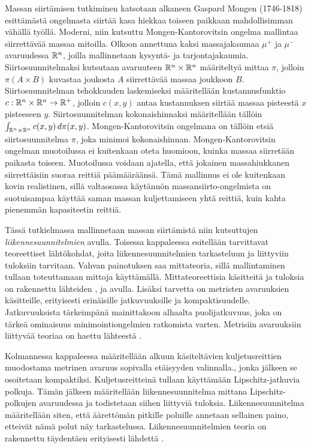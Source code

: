 \documentclass[12pt,oneside,a4paper]{amsbook} %
\begin{document}
Massan siirtämisen tutkiminen katsotaan alkaneen Gaspard Mongen (1746-1818) esittämästä ongelmasta \cite{monge} siirtää kasa hiekkaa toiseen paikkaan mahdollisimman vähällä työllä. Moderni, niin kutsuttu Mongen-Kantorovitsin ongelma mallintaa siirrettävää massaa mitoilla. Olkoon annettuna kaksi massajakaumaa $\mu^+$ ja $\mu^-$ avaruudessa $\mathbb{R}^n$, joilla mallinnetaan kysyntä- ja tarjontajakaumia. Siirtosuunnitelmaksi kutsutaan avaruuteen $\mathbb{R}^n \times \mathbb{R}^n$ määriteltyä mittaa $\pi$, jolloin $\pi(A\times B)$ kuvastaa joukosta $A$ siirrettävää massaa joukkoon $B$. Siirtosuunnitelman tehokkuuden laskemiseksi määritellään kustannusfunktio $c:\mathbb{R}^n\times \mathbb{R}^n \to {\mathbb{R}^{+}}$, jolloin $c(x, y)$ antaa kustannuksen siirtää massaa pisteestä $x$ pisteeseen $y$. Siirtosuunnitelman kokonaishinnaksi määritellään tällöin $\int_{\mathbb{R}^n\times \mathbb{R}^n} c(x, y) \, d\pi(x, y)$. Mongen-Kantorovitsin ongelmana on tällöin etsiä siirtosuunnitelma $\pi$, joka minimoi kokonaishinnan. \cite[s. 11]{optimal} Mongen-Kantorovitsin ongelman muotoilussa ei kuitenkaan oteta huomioon, kuinka massaa siirretään paikasta toiseen. Muotoilussa voidaan ajatella, että jokainen massahiukkanen siirrettäisiin suoraa reittiä päämääräänsä. Tämä mallinnus ei ole kuitenkaan kovin realistinen, sillä valtaosassa käytännön massansiirto-ongelmista on suotuisampaa käyttää saman massan kuljettamiseen yhtä reittiä, kuin kahta pienemmän kapasiteetin reittiä. 

Tässä tutkielmassa mallinnetaan massan siirtämistä niin kutsuttujen \textit{liikennesuunnitelmien} avulla. Toisessa kappaleessa esitellään tarvittavat teoreettiset lähtökohdat, joita liikennesuunnitelmien tarkasteluun ja liittyviin tuloksiin tarvitaan. Vahvan painotuksen saa mittateoria, sillä mallintaminen tullaan toteuttamaan mittoja käyttämällä. Mittateoreettisia käsitteitä ja tuloksia on rakennettu lähteiden \cite{lehrbäck}, \cite{rudin} ja \cite{conway} avulla. Lisäksi tarvetta on metristen avaruuksien käsitteille, erityisesti erinäisille jatkuvuuksille ja kompaktisuudelle. Jatkuvuuksista tärkeimpänä mainittakoon alhaalta puolijatkuvuus, joka on tärkeä ominaisuus minimointiongelmien ratkomista varten. Metrisiin avaruuksiin liittyvää teoriaa on haettu lähteestä \cite{rudin}.

Kolmannessa kappaleessa määritellään alkuun käsiteltävien kuljetusreittien muodostama metrinen avaruus sopivalla etäisyyden valinnalla., jonka jälkeen se osoitetaan kompaktiksi. Kuljetusreitteinä tullaan käyttämään Lipschitz-jatkuvia polkuja. Tämän jälkeen määritellään liikennesuunnitelma mittana Lipschitz-polkujen avaruudessa ja todistetaan siihen liittyviä tuloksia. Liikennesuunnitelma määritellään siten, että äärettömän pitkille poluille annetaan sellainen paino, etteivät nämä polut näy tarkastelussa. Liikennesuunnitelmien teoria on rakennettu täydentäen erityisesti lähdettä \cite{optimal}.
\end{document}
